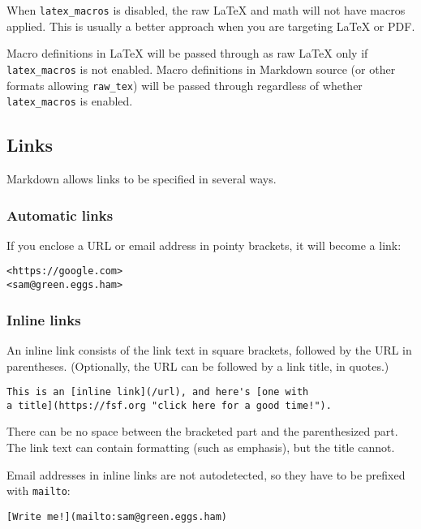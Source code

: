\documentclass[
]{article}
\begin{document}
When \texttt{latex\_macros} is disabled, the raw LaTeX and math will not
have macros applied. This is usually a better approach when you are
targeting LaTeX or PDF.

Macro definitions in LaTeX will be passed through as raw LaTeX only if
\texttt{latex\_macros} is not enabled. Macro definitions in Markdown
source (or other formats allowing \texttt{raw\_tex}) will be passed
through regardless of whether \texttt{latex\_macros} is enabled.

\subsection{Links}\label{links-1}

Markdown allows links to be specified in several ways.

\subsubsection{Automatic links}\label{automatic-links}

If you enclose a URL or email address in pointy brackets, it will become
a link:

\begin{verbatim}
<https://google.com>
<sam@green.eggs.ham>
\end{verbatim}

\subsubsection{Inline links}\label{inline-links}

An inline link consists of the link text in square brackets, followed by
the URL in parentheses. (Optionally, the URL can be followed by a link
title, in quotes.)

\begin{verbatim}
This is an [inline link](/url), and here's [one with
a title](https://fsf.org "click here for a good time!").
\end{verbatim}

There can be no space between the bracketed part and the parenthesized
part. The link text can contain formatting (such as emphasis), but the
title cannot.

Email addresses in inline links are not autodetected, so they have to be
prefixed with \texttt{mailto}:

\begin{verbatim}
[Write me!](mailto:sam@green.eggs.ham)
\end{verbatim}
\end{document}
